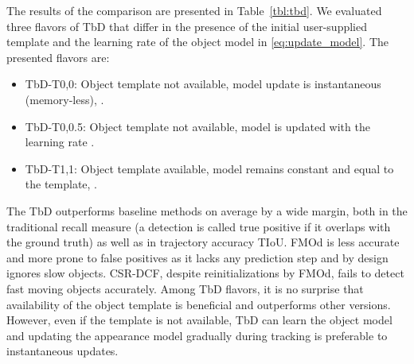 \documentclass[10pt,twocolumn,letterpaper]{article}
\begin{document}
\begin{table*}
\begin{center}
\begin{tabular}{l|r|c|c|c|c|c|c|c|c|c|c|c}
\hline
\end{tabular}
\end{center}
\caption{Trajectory Intersection over Union (TIoU) and Recall (Rcl) on the TbD dataset -- 
comparison  of the TbD, CSR-DCF\cite{csrdcf} trackers and the Fast Moving Object method~\cite{fmo}. 
CSR-DCF is a standard,  well-performning~\cite{vot2018}, near-real time tracker.
TbD tracker settings: TbD without template and with exponential forgetting factors~\eqref{eq:update_model}  (TbD-T0, 0) and  (TbD-T0, 0.5), TbD with template and  (TbD-T1, 1), TbD with oracle (TbD-O). The highest TIoU for each sequence is highlighted in blue color and the highest recall in cyan color. TbD-O shows the highest attainable TIoU for TbD as a reference point when predictions are precise. The number of frames is indicated by \#.}
\label{tbl:tbd}
\end{table*}







%
 The results of the comparison are presented in Table~\ref{tbl:tbd}. We evaluated three flavors of TbD that differ in the presence of the initial user-supplied template  and the learning rate  of the object model in \eqref{eq:update_model}. The presented flavors are:
\vspace*{-1ex}
\begin{itemize}[leftmargin=*]
	\setlength\itemsep{-0.25em}
	\item TbD-T0,0: Object template not available, model update is instantaneous (memory-less), .
	\item TbD-T0,0.5: Object template not available, model is updated with the learning rate .
	\item TbD-T1,1: Object template available, model remains constant and equal to the template, .
\end{itemize}
\vspace*{-1ex}
The TbD outperforms baseline methods on average by a wide margin, both in the traditional recall measure (a detection is called true positive if it overlaps with the ground truth) as well as in trajectory accuracy TIoU. FMOd is less accurate and more prone to false positives as it lacks any prediction step and by design ignores slow objects. CSR-DCF, despite reinitializations by FMOd, fails to detect fast moving objects accurately. Among TbD flavors, it is no surprise that availability of the object template is beneficial and outperforms other versions. However, even if the template is not available, TbD can learn the object model and updating the appearance model gradually during tracking is preferable to instantaneous updates.
\end{document}
